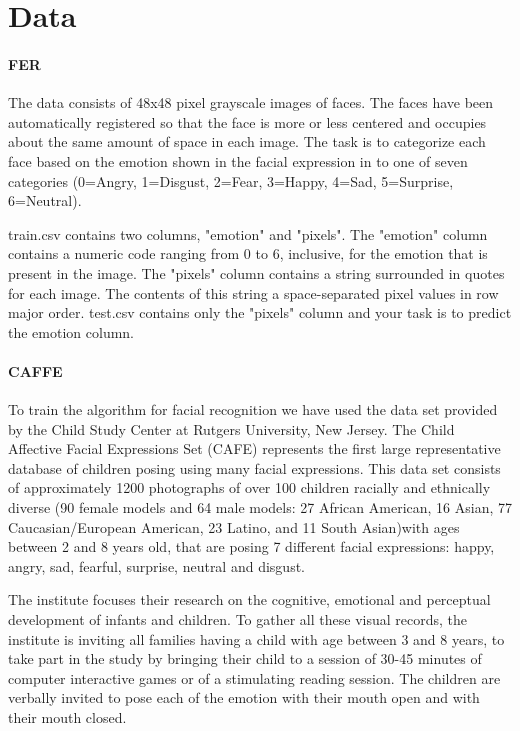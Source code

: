 \documentclass[runningheads,a4paper,11pt]{report}
\begin{document}
\section{Data}
\label{section:data}

\paragraph{FER}

The data consists of 48x48 pixel grayscale images of faces. The faces have been automatically registered so that the face is more or less centered and occupies about the same amount of space in each image. The task is to categorize each face based on the emotion shown in the facial expression in to one of seven categories (0=Angry, 1=Disgust, 2=Fear, 3=Happy, 4=Sad, 5=Surprise, 6=Neutral).

train.csv contains two columns, "emotion" and "pixels". The "emotion" column contains a numeric code ranging from 0 to 6, inclusive, for the emotion that is present in the image. The "pixels" column contains a string surrounded in quotes for each image. The contents of this string a space-separated pixel values in row major order. test.csv contains only the "pixels" column and your task is to predict the emotion column.

\paragraph{CAFFE}
To train the algorithm for facial recognition we have used the data set provided by the Child Study Center at Rutgers University, New Jersey.
The Child Affective Facial Expressions Set (CAFE)\cite{cafe} represents the first large representative database of children posing using many facial expressions.
This data set consists of approximately 1200 photographs of over 100 children racially and ethnically diverse (90 female models and 64 male models: 27 African American, 16 Asian, 77 Caucasian/European American, 23 Latino, and 11 South Asian)with ages between 2 and 8 years old, that are posing 7 different facial expressions:  happy, angry, sad, fearful, surprise, neutral and disgust.


The institute focuses their research on the cognitive, emotional and perceptual development of infants and children. To gather all these visual records, the institute is inviting all families having a child with age between 3 and 8 years, to take part in the study by bringing their child to a session of 30-45 minutes of computer interactive games or of a stimulating reading session. The children are verbally invited to pose each of the emotion with their mouth open and with their mouth closed.
\end{document}
